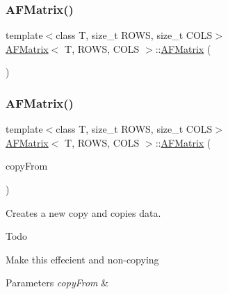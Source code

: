 \subsubsection{\texorpdfstring{A\+F\+Matrix()}{AFMatrix()}\hspace{0.1cm}{\footnotesize\ttfamily [1/3]}}
{\footnotesize\ttfamily template$<$class T, size\+\_\+t R\+O\+WS, size\+\_\+t C\+O\+LS$>$ \\
\hyperlink{class_a_f_matrix}{A\+F\+Matrix}$<$ T, R\+O\+WS, C\+O\+LS $>$\+::\hyperlink{class_a_f_matrix}{A\+F\+Matrix} (\begin{DoxyParamCaption}{ }\end{DoxyParamCaption})\hspace{0.3cm}{\ttfamily [inline]}}

\mbox{\label{class_a_f_matrix_ae76418eb02f3f9b84ee13aebaeca564a}} 
\subsubsection{\texorpdfstring{A\+F\+Matrix()}{AFMatrix()}\hspace{0.1cm}{\footnotesize\ttfamily [2/3]}}
{\footnotesize\ttfamily template$<$class T, size\+\_\+t R\+O\+WS, size\+\_\+t C\+O\+LS$>$ \\
\hyperlink{class_a_f_matrix}{A\+F\+Matrix}$<$ T, R\+O\+WS, C\+O\+LS $>$\+::\hyperlink{class_a_f_matrix}{A\+F\+Matrix} (\begin{DoxyParamCaption}\item[{\hyperlink{class_a_f_matrix}{A\+F\+Matrix}$<$ T, R\+O\+WS, C\+O\+LS $>$ $\ast$}]{copy\+From }\end{DoxyParamCaption})\hspace{0.3cm}{\ttfamily [inline]}}

Creates a new copy and copies data. \begin{DoxyRefDesc}{Todo}
\item[\hyperlink{todo__todo000002}{Todo}]Make this effecient and non-\/copying \end{DoxyRefDesc}

\begin{DoxyParams}{Parameters}
{\em copy\+From} & \\
\hline
\end{DoxyParams}
\mbox{\label{class_a_f_matrix_a8c1d7fdbf92372be7e13cd4cccfb7714}} 
